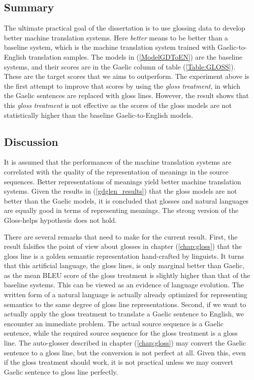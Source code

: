 \documentclass[final]{ua-thesis}
\numberwithin{equation}{section}
\begin{document}
\subsection{Summary}
The ultimate practical goal of the dissertation is to use glossing data to develop better machine translation systems. Here \textit{better} means to be better than a baseline system, which is the machine translation system trained with Gaelic-to-English translation samples. The models in (\ref{ModelGDToEN}) are the baseline systems, and their scores are in the Gaelic column of table (\ref{Table:GLOSS}). These are the target scores that we aims to outperform. The experiment above is the first attempt to improve that scores by using the \textit{gloss treatment}, in which the Gaelic sentences are replaced with gloss lines.  However, the result shows that this \textit{gloss treatment} is not effective as the scores of the gloss models are not statistically higher than the baseline Gaelic-to-English models. 

\subsection{Discussion}
It is assumed that the performances of the machine translation systems are correlated with the quality of the representation of meanings in the source sequences. Better representations of meanings yield better machine translation systems. Given the results in (\ref{gdglen_results}) that the gloss models are not better than the Gaelic models, it is concluded that glosses and natural languages are equally good in terms of representing meanings. The strong version of the Gloss-helps hypothesis does not hold.

There are several remarks that need to make for the current result. First, the result falsifies the point of view about glosses in chapter (\ref{chap:gloss}) that the gloss line is a golden semantic representation hand-crafted by linguists.
It turns that this artificial language, the gloss lines, is only marginal better than Gaelic, as the mean BLEU score of the gloss treatment is slightly higher than that of the baseline systems. This can be viewed as an evidence of language evolution.
The written form of a natural language is actually already optimized for representing semantics to the same degree of gloss line representations.
Second, if we want to actually apply the gloss treatment to translate a Gaelic sentence to English, we encounter an immediate problem. The actual source sequence is a Gaelic sentence, while the required source sequence for the gloss treatment is a gloss line. The auto-glosser described in chapter (\ref{chap:gloss}) may convert the Gaelic sentence to a gloss line, but the conversion is not perfect at all. Given this, even if the gloss treatment should work, it is not practical unless we may convert Gaelic sentence to gloss line perfectly.      
\end{document}
